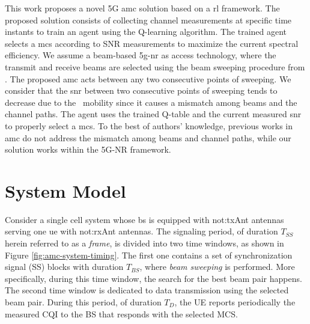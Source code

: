 This work proposes a novel 5G \gls{amc} solution based on a \gls{rl} framework.
%
The proposed solution consists of collecting channel measurements at specific time instants to train an agent using the Q-learning algorithm.
%
The trained agent selects  a \gls{mcs} according to SNR measurements to maximize the current spectral efficiency.
%
We assume  a beam-based \gls{5g}-\gls{nr} as access technology, where the transmit and receive beams are selected using the beam sweeping procedure from \cite{giordani21}. The proposed \gls{amc} acts between any two consecutive points of sweeping.
%
We consider that the \gls{snr} between two consecutive points of sweeping tends to decrease due to the \ue~mobility  since it causes a mismatch among beams and the channel paths.
%
The agent uses the trained Q-table and the current measured \gls{snr} to properly select a \gls{mcs}.
%
To the best of authors' knowledge, previous works in \gls{amc} do not address the mismatch among beams and channel paths, while our solution works within the 5G-NR framework.

\section{System Model}
\label{sec:amc-system-model}

Consider a single cell system whose \gls{bs} is equipped with \gls{not:txAnt} antennas serving one \gls{ue} with \gls{not:rxAnt} antennas. The signaling period, of duration $T_{SS}$ herein referred to as a \emph{frame}, is divided into two time windows, as shown in Figure \ref{fig:amc-system-timing}. The first one contains a set of synchronization signal (SS) blocks with duration $T_{BS}$, where \emph{beam sweeping} is performed. More specifically, during this time window, the search for the best beam pair happens. The second time window is dedicated to data transmission using the selected beam pair. During this period, of duration $T_{D}$, the UE reports periodically the measured CQI to the BS that responds with the selected MCS.
%
%

